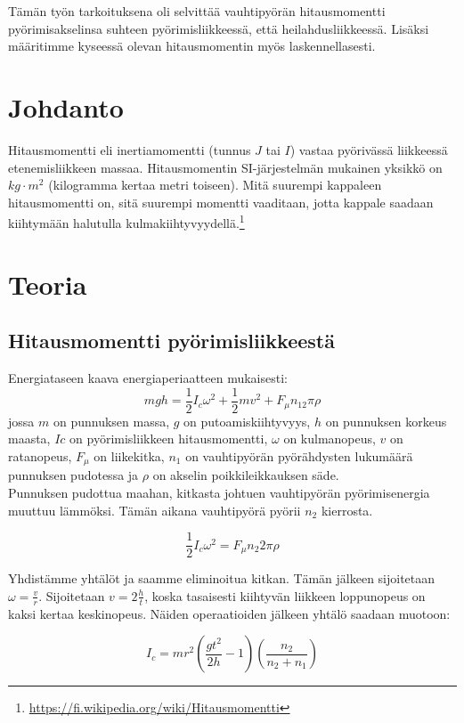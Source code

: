 \documentclass[]{article}
\begin{document}
Tämän työn tarkoituksena oli selvittää vauhtipyörän hitausmomentti
pyörimisakselinsa suhteen pyörimisliikkeessä, että heilahdusliikkeessä.
Lisäksi määritimme kyseessä olevan hitausmomentin myös laskennellasesti.

\section{Johdanto}\label{johdanto}

Hitausmomentti eli inertiamomentti (tunnus \(J\) tai \(I\)) vastaa
pyörivässä liikkeessä etenemisliikkeen massaa. Hitausmomentin
SI-järjestelmän mukainen yksikkö on \(kg\cdot m^2\) (kilogramma kertaa
metri toiseen). Mitä suurempi kappaleen hitausmomentti on, sitä suurempi
momentti vaaditaan, jotta kappale saadaan kiihtymään halutulla
kulmakiihtyvyydellä.\footnote{\url{https://fi.wikipedia.org/wiki/Hitausmomentti}}

\section{Teoria}\label{teoria}

\subsection{Hitausmomentti
pyörimisliikkeestä}\label{hitausmomentti-pyorimisliikkeesta}

Energiataseen kaava energiaperiaatteen mukaisesti:
\[ \tag{1} mgh = \frac{1}{2}I_c\omega^2 + \frac{1}{2}mv^2+F_{\mu}n_12\pi\rho \]
jossa \(m\) on punnuksen massa, \(g\) on putoamiskiihtyvyys, \(h\) on
punnuksen korkeus maasta, \(Ic\) on pyörimisliikkeen hitausmomentti,
\(\omega\) on kulmanopeus, \(v\) on ratanopeus, \(F_\mu\) on liikekitka,
\(n_1\) on vauhtipyörän pyörähdysten lukumäärä punnuksen pudotessa ja
\(\rho\) on akselin poikkileikkauksen säde.\\
Punnuksen pudottua maahan, kitkasta johtuen vauhtipyörän pyörimisenergia
muuttuu lämmöksi. Tämän aikana vauhtipyörä pyörii \(n_2\) kierrosta.

\[ \tag{2} \frac{1}{2}I_c\omega^2=F_\mu n_2 2\pi\rho \]

Yhdistämme yhtälöt ja saamme eliminoitua kitkan. Tämän jälkeen
sijoitetaan \(\omega = \frac{v}{r}\). Sijoitetaan \(v=2\frac{h}{t}\),
koska tasaisesti kiihtyvän liikkeen loppunopeus on kaksi kertaa
keskinopeus. Näiden operaatioiden jälkeen yhtälö saadaan muotoon:

\[ \label{hitausmomenttipyorii} \tag{3} I_c=mr^2(\frac{gt^2}{2h}-1)(\frac{n_2}{n_2+n_1})\]
\end{document}

